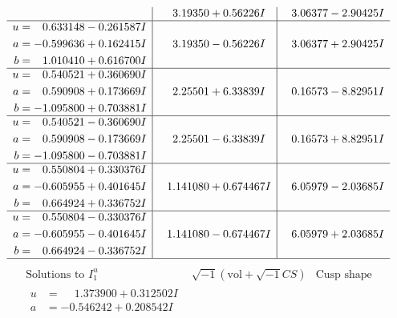 \documentclass[1p]{elsarticle_modified}
\theoremstyle{definition}
\newcommand{\I}{\sqrt{-1}}
\begin{document}
$$\begin{array}{c|c|c}
 & \phantom{-}3.19350 + 0.56226 I & \phantom{-}3.06377 - 2.90425 I \\ \hline\begin{aligned}
u &= \phantom{-}0.633148 - 0.261587 I \\
a &= -0.599636 + 0.162415 I \\
b &= \phantom{-}1.010410 + 0.616700 I\end{aligned}
 & \phantom{-}3.19350 - 0.56226 I & \phantom{-}3.06377 + 2.90425 I \\ \hline\begin{aligned}
u &= \phantom{-}0.540521 + 0.360690 I \\
a &= \phantom{-}0.590908 + 0.173669 I \\
b &= -1.095800 + 0.703881 I\end{aligned}
 & \phantom{-}2.25501 + 6.33839 I & \phantom{-}0.16573 - 8.82951 I \\ \hline\begin{aligned}
u &= \phantom{-}0.540521 - 0.360690 I \\
a &= \phantom{-}0.590908 - 0.173669 I \\
b &= -1.095800 - 0.703881 I\end{aligned}
 & \phantom{-}2.25501 - 6.33839 I & \phantom{-}0.16573 + 8.82951 I \\ \hline\begin{aligned}
u &= \phantom{-}0.550804 + 0.330376 I \\
a &= -0.605955 + 0.401645 I \\
b &= \phantom{-}0.664924 + 0.336752 I\end{aligned}
 & \phantom{-}1.141080 + 0.674467 I & \phantom{-}6.05979 - 2.03685 I \\ \hline\begin{aligned}
u &= \phantom{-}0.550804 - 0.330376 I \\
a &= -0.605955 - 0.401645 I \\
b &= \phantom{-}0.664924 - 0.336752 I\end{aligned}
 & \phantom{-}1.141080 - 0.674467 I & \phantom{-}6.05979 + 2.03685 I\\
 \hline 
 \end{array}$$\newpage$$\begin{array}{c|c|c}  
\text{Solutions to }I^u_{1}& \I (\text{vol} + \sqrt{-1}CS) & \text{Cusp shape}\\
 \hline 
\begin{aligned}
u &= \phantom{-}1.373900 + 0.312502 I \\
a &= -0.546242 + 0.208542 I \\

\end{aligned}
\end{array}$$
\end{document}
